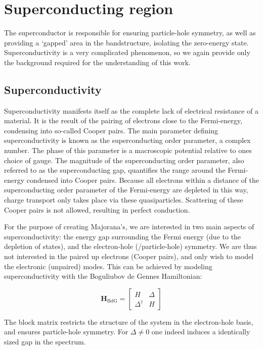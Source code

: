 \section{Superconducting region}
    The superconductor is responsible for ensuring particle-hole symmetry, as well as providing a `gapped' area in the bandstructure, isolating the zero-energy state.
    Superconductivity is a very complicated phenomenon, so we again provide only the background required for the understanding of this work.

    \subsection{Superconductivity}
		Superconductivity manifests itself as the complete lack of electrical resistance of a material.
		It is the result of the pairing of electrons close to the Fermi-energy, condensing into so-called Cooper pairs.
		The main parameter defining superconductivity is known as the superconducting order parameter, a complex number.
		The phase of this parameter is a macroscopic potential relative to ones choice of gauge.
		The magnitude of the superconducting order parameter, also referred to as the superconducting gap, quantifies the range around the Fermi-energy condensed into Cooper pairs.
		Because all electrons within a distance of the superconducting order parameter of the Fermi-energy are depleted in this way, charge transport only takes place via these quasiparticles.
		Scattering of these Cooper pairs is not allowed, resulting in perfect conduction.

		For the purpose of creating Majorana's, we are interested in two main aspects of superconductivity: the energy gap surrounding the Fermi energy (due to the depletion of states), and the electron-hole (/particle-hole) symmetry.
		We are thus not interested in the paired up electrons (Cooper pairs), and only wish to model the electronic (unpaired) modes.
		This can be achieved by modeling superconductivity with the Boguliubov de Gennes Hamiltonian:
		
		\begin{equation}
		\mathbf{H}_\text{BdG} = \begin{bmatrix} H & \Delta \\ \Delta^\dagger & H \end{bmatrix}
		\end{equation}

		The block matrix restricts the structure of the system in the electron-hole basis, and ensures particle-hole symmetry.
		For $\Delta \neq 0$ one indeed induces a identically sized gap in the spectrum.


